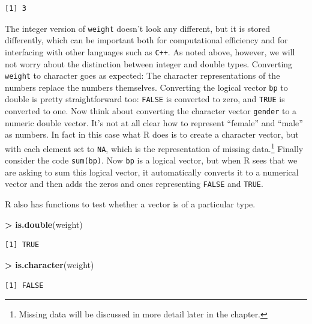 \documentclass[]{krantz}
\makeatletter
\newenvironment{Shaded}{\begin{snugshade}}{\end{snugshade}}
\newcommand{\KeywordTok}[1]{\textcolor[rgb]{0.27,0.27,0.27}{\textbf{#1}}}
\newcommand{\NormalTok}[1]{#1}
\newcommand{\OperatorTok}[1]{\textcolor[rgb]{0.43,0.43,0.43}{\textbf{#1}}}
\newcommand{\StringTok}[1]{\textcolor[rgb]{0.5,0.5,0.5}{#1}}
\newenvironment{kframe}{%
\medskip{}
\setlength{\fboxsep}{.8em}
 \def\at@end@of@kframe{}%
 \ifinner\ifhmode%
  \def\at@end@of@kframe{\end{minipage}}%
  \begin{minipage}{\columnwidth}%
 \fi\fi%
 \def\FrameCommand##1{\hskip\@totalleftmargin \hskip-\fboxsep
 \colorbox{shadecolor}{##1}\hskip-\fboxsep
     \hskip-\linewidth \hskip-\@totalleftmargin \hskip\columnwidth}%
 \MakeFramed {\advance\hsize-\width
   \@totalleftmargin\z@ \linewidth\hsize
   \@setminipage}}%
 {\par\unskip\endMakeFramed%
 \at@end@of@kframe}
\renewenvironment{Shaded}{\begin{kframe}}{\end{kframe}}
\makeatother
\begin{document}
\begin{verbatim}
[1] 3
\end{verbatim}

The integer version of \texttt{weight} doesn't look any different, but it is stored differently, which can be important both for computational efficiency and for interfacing with other languages such as \texttt{C++}. As noted above, however, we will not worry about the distinction between integer and double types. Converting \texttt{weight} to character goes as expected: The character representations of the numbers replace the numbers themselves. Converting the logical vector \texttt{bp} to double is pretty straightforward too: \texttt{FALSE} is converted to zero, and \texttt{TRUE} is converted to one. Now think about converting the character vector \texttt{gender} to a numeric double vector. It's not at all clear how to represent ``female'' and ``male'' as numbers. In fact in this case what R does is to create a character vector, but with each element set to \texttt{NA}, which is the representation of missing data.\footnote{Missing data will be discussed in more detail later in the chapter.} Finally consider the code \texttt{sum(bp)}. Now \texttt{bp} is a logical vector, but when R sees that we are asking to sum this logical vector, it automatically converts it to a numerical vector and then adds the zeros and ones representing \texttt{FALSE} and \texttt{TRUE}.

R also has functions to test whether a vector is of a particular type.

\begin{Shaded}
\begin{Highlighting}[]
\OperatorTok{>}\StringTok{ }\KeywordTok{is.double}\NormalTok{(weight)}
\end{Highlighting}
\end{Shaded}

\begin{verbatim}
[1] TRUE
\end{verbatim}

\begin{Shaded}
\begin{Highlighting}[]
\OperatorTok{>}\StringTok{ }\KeywordTok{is.character}\NormalTok{(weight)}
\end{Highlighting}
\end{Shaded}

\begin{verbatim}
[1] FALSE
\end{verbatim}
\end{document}
